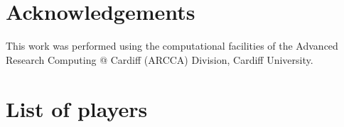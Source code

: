\documentclass{article}
\begin{document}
\section*{Acknowledgements}

This work was performed using the computational facilities of the Advanced
Research Computing @ Cardiff (ARCCA) Division, Cardiff University.

\printbibliography

\appendix

\section{List of players}\label{app:list_of_players}

\begin{multicols}{3}
	\begin{enumerate}
		
	\end{enumerate}
\end{multicols}
\end{document}
